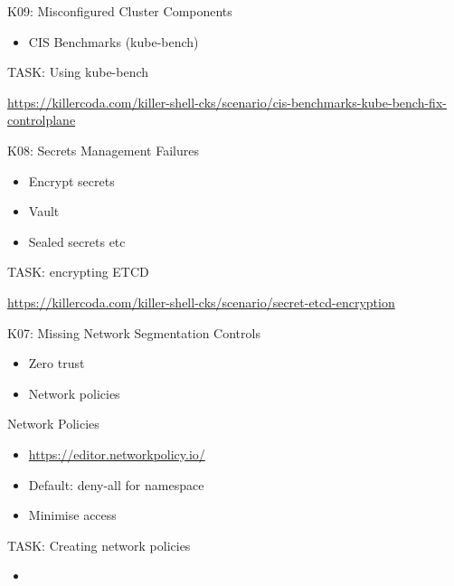 \documentclass{dcpresentation}
\begin{document}
\begin{frame}{K09: Misconfigured Cluster Components}
  \begin{itemize}
  \item CIS Benchmarks (kube-bench)
  \end{itemize}
\end{frame}

\begin{frame}{TASK: Using kube-bench}
 \begin{itemize}
  \url{https://killercoda.com/killer-shell-cks/scenario/cis-benchmarks-kube-bench-fix-controlplane}
 \end{itemize}
\end{frame}

\begin{frame}{K08: Secrets Management Failures}
  \begin{itemize}
  \item Encrypt secrets
  \item Vault
  \item Sealed secrets etc
  \end{itemize}
\end{frame}

\begin{frame}{TASK: encrypting ETCD}
 \begin{itemize}
  \url{https://killercoda.com/killer-shell-cks/scenario/secret-etcd-encryption}
 \end{itemize}
\end{frame}

\begin{frame}{K07: Missing Network Segmentation Controls}
  \begin{itemize}
  \item Zero trust 
  \item Network policies
  \end{itemize}
\end{frame}

\begin{frame}{Network Policies}
  \begin{itemize}
  \item \url{https://editor.networkpolicy.io/}
  \item Default: deny-all for namespace
  \item Minimise access
  \end{itemize}
  
\begin{frame}{TASK: Creating network policies}
 \begin{itemize}
   \item 
 \end{itemize}
\end{frame}  
  
\end{frame}
\end{document}
